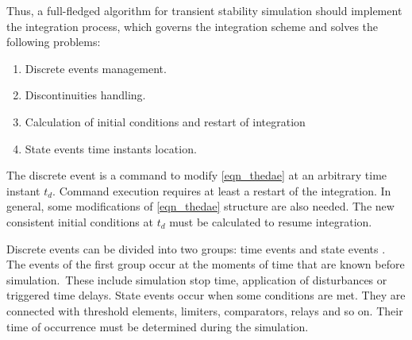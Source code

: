 \documentclass[lettersize,journal]{IEEEtran}
\begin{document}
Thus, a full-fledged algorithm for transient stability simulation should implement the integration process, which governs the integration scheme and solves the following problems:
\begin{enumerate}
	\item Discrete events management.
	\item Discontinuities handling.
	\item Calculation of initial conditions and restart of integration
	\item State events time instants location.
\end{enumerate}

The discrete event is a command to modify \eqref{eqn_thedae} at an arbitrary time instant \(t_d\). Command execution requires at least a restart of the integration. In general, some modifications of \eqref{eqn_thedae} structure are also needed. The new consistent initial conditions at \(t_d\) must be calculated to resume integration.

Discrete events can be divided into two groups: time events and state events \cite{cellier06}.  The events of the first group occur at the moments of time that are known before simulation. These include simulation stop time, application of disturbances or triggered time delays. State events occur when some conditions are met. They are connected with threshold elements, limiters, comparators, relays and so on.  Their time of occurrence must be determined during the simulation. 
\end{document}
